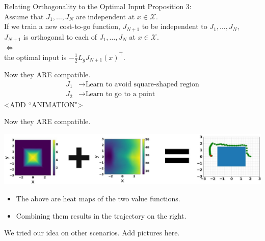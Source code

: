 \begin{frame}{Relating Orthogonality to the Optimal Input}
Proposition 3:\\
Assume that ${J}_1, \ldots, {J}_N$ are independent at $x \in \mathcal{X}$.\\
If we train a new cost-to-go function, ${J}_{N + 1}$ to be independent to ${J}_1, \ldots, {J}_N$,\\
${J}_{N + 1}$ is orthogonal to each of ${J}_1, \ldots, {J}_N$ at $x \in \mathcal{X}$.\\ 
$\Leftrightarrow$\\ 
the optimal input is $- \frac{1}{2} L_g {J}_{N + 1} (x)^{\top}$.
\end{frame}

\begin{frame}{Now they ARE compatible.}
	\begin{align*}
		{J}_1 &\rightarrow \textrm{Learn to avoid square-shaped region} \\
		{J}_2 &\rightarrow \textrm{Learn to go to a point}
	\end{align*}
	<ADD ``ANIMATION">
\end{frame}

\begin{frame}{Now they ARE compatible.}
	\begin{minipage}{\textwidth}
		\centering		
		\includegraphics[width=1.\linewidth]{diagramMath2}
	\end{minipage}%
	\seprule
	\begin{itemize}
		\item{The above are heat maps of the two value functions.}
		\item{Combining them results in the trajectory on the right.}
	\end{itemize}
\end{frame}

\begin{frame}{We tried our idea on other scenarios.}
	Add pictures here.
\end{frame}



